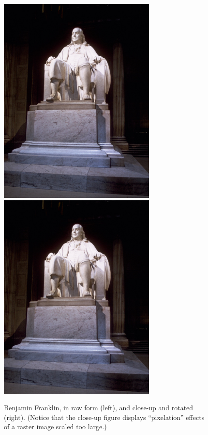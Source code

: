\begin{figure}
\begin{center}
\includegraphics{figs/ben}
\includegraphics[viewport=.9in 2.1in 1.15in 2.35in,clip,
    scale=10.67,angle=90]{figs/ben}
\end{center}
\caption{Benjamin Franklin, in raw form (left), and close-up and
  rotated (right).  (Notice that the close-up figure displays
  ``pixelation'' effects of a raster image scaled too large.)}
\label{franklin}
\end{figure}

